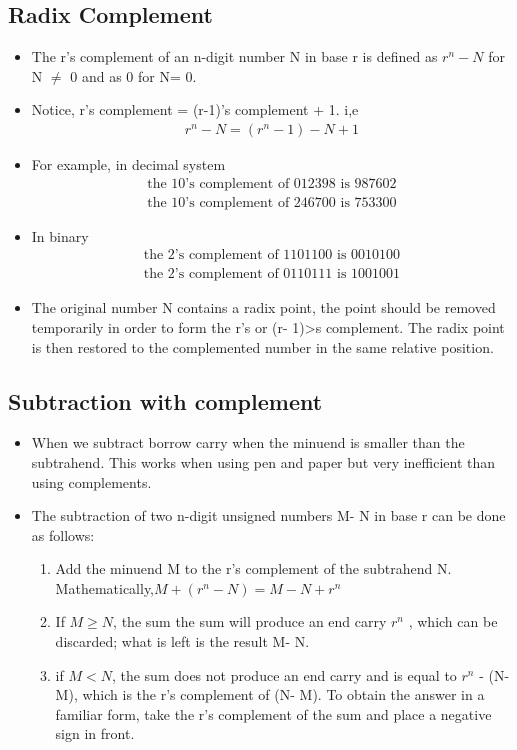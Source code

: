 \documentclass{article}
\begin{document}
\subsection{Radix Complement}
\begin{itemize}
    \item The r’s complement of an n-digit number N in base r is defined as $r^n- N$ for N $\neq$ 0 and as 0 for N= 0.
    \item Notice, r's complement = (r-1)'s complement + 1. i,e
    \begin{align}
        r^n-N=(r^n-1)-N+1
    \end{align}
    \item For example, in decimal system 
    \begin{align}
        \text{the 10's complement of 012398 is 987602}\\
        \text{the 10's complement of 246700 is 753300}
    \end{align}
    \item In binary
    \begin{align}
        \text{the 2's complement of 1101100 is 0010100}\\
        \text{the 2's complement of 0110111 is 1001001}
    \end{align}
    \item  The original number N contains a radix point, the point should be removed temporarily in order to form the r’s or (r- 1)>s complement. The radix point is then
restored to the complemented number in the same relative position.
\end{itemize}
\subsection{Subtraction with complement}
\begin{itemize}
    \item When we subtract borrow carry when the minuend is smaller than the subtrahend. This works when using pen and paper but very inefficient than using complements.
    \item The subtraction of two n-digit unsigned numbers M- N in base r can be done as follows:
    \begin{enumerate}
        \item Add the minuend M to the r’s complement of the subtrahend N. Mathematically,$M+(r^n-N)=M-N+r^n$
        \item If $M \geq N$, the sum the sum will produce an end carry $r^n$
, which can be discarded; what is
left is the result M- N.
        \item if $M<N$, the sum does not produce an end carry and is equal to $r^n$
- (N- M),
which is the r’s complement of (N- M). To obtain the answer in a familiar form,
take the r’s complement of the sum and place a negative sign in front.
    \end{enumerate}
\end{itemize}
\end{document}
